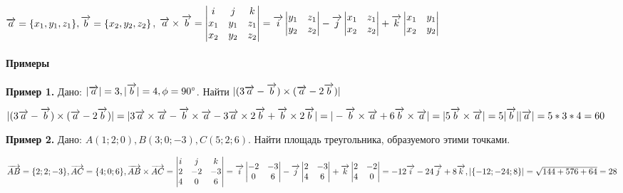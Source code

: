 \documentclass{article}
\def\vec{\ensuremath\overrightarrow}
\begin{document}
\begin{flushleft}
$\vec{a} = \{ x_1, y_1, z_1 \}, \vec{b} = \{ x_2, y_2, z_2 \}$, $\vec{a} \times \vec{b} = \begin{vmatrix}
    i & j & k \\
    x_1 & y_1 & z_1 \\
    x_2 & y_2 & z_2
\end{vmatrix} = \vec{i} \begin{vmatrix}
    y_1 & z_1 \\
    y_2 & z_2
\end{vmatrix} - \vec{j} \begin{vmatrix}
    x_1 & z_1 \\
    x_2 & z_2
\end{vmatrix} + \vec{k} \begin{vmatrix}
    x_1 & y_1 \\
    x_2 & y_2
\end{vmatrix}$

\paragraph{Примеры}

\hfill

\textbf{Пример 1.} Дано: $|\vec{a}| = 3, |\vec{b}| = 4, \phi = 90^{\circ}$. Найти $|(3\vec{a} - \vec{b}) \times (\vec{a} - 2\vec{b})|$

$|(3\vec{a} - \vec{b}) \times (\vec{a} - 2\vec{b})| = |3\vec{a} \times \vec{a} - \vec{b} \times \vec{a} - 3\vec{a} \times 2 \vec{b} + \vec{b} \times 2 \vec{b}| = |-\vec{b} \times \vec{a} + 6\vec{b} \times \vec{a}| = |5\vec{b} \times \vec{a}| = 5 |\vec{b}| |\vec{a}| = 5 * 3 * 4 = 60$

\hfill

\textbf{Пример 2.} Дано: $A(1; 2; 0), B(3; 0; -3), C(5; 2; 6)$. Найти площадь треугольника, образуемого этими точками.

$\vec{AB} = \{ 2; 2; -3 \}, \vec{AC} = \{4; 0; 6 \}, \vec{AB} \times \vec{AC} = \begin{vmatrix}
    i & j & k \\
    2 & -2 & -3 \\
    4 & 0 & 6
\end{vmatrix} = \vec{i} \begin{vmatrix}
    -2 & -3 \\
    0 & 6
\end{vmatrix} - \vec{j} \begin{vmatrix}
    2 & -3 \\
    4 & 6
\end{vmatrix} + \vec{k} \begin{vmatrix}
    2 & -2 \\
    4 & 0
\end{vmatrix} = -12\vec{i} - 24\vec{j} + 8\vec{k}, |\{ -12; -24; 8 \}| = \sqrt{144 + 576 + 64} = 28$


\end{flushleft}
\end{document}
